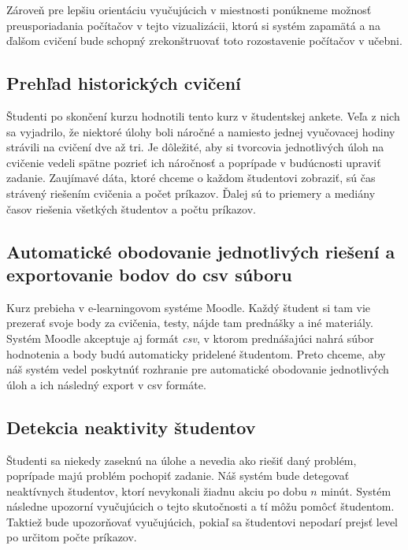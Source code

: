 Zároveň pre lepšiu orientáciu vyučujúcich v miestnosti ponúkneme možnosť
preusporiadania počítačov v tejto vizualizácii, ktorú si systém zapamätá a
na ďalšom cvičení bude schopný zrekonštruovať toto rozostavenie počítačov v učebni.

\subsection{Prehľad historických cvičení}
\label{sec:apprequirements:overview}

Študenti po skončení kurzu hodnotili tento kurz v študentskej ankete. Veľa z nich
sa vyjadrilo, že niektoré úlohy boli náročné a namiesto jednej vyučovacej hodiny
strávili na cvičení dve až tri.
Je dôležité, aby si tvorcovia jednotlivých úloh na cvičenie vedeli spätne pozrieť
ich náročnosť a poprípade v budúcnosti upraviť zadanie.
Zaujímavé dáta, ktoré chceme o každom študentovi zobraziť, sú čas strávený riešením cvičenia a počet príkazov. Ďalej sú to priemery a mediány časov riešenia všetkých študentov a počtu príkazov.


\subsection{Automatické obodovanie jednotlivých riešení a exportovanie bodov do csv súboru}
\label{sec:apprequirements:export}

Kurz prebieha v e-learningovom systéme Moodle. Každý študent si tam vie prezerať
svoje body za cvičenia, testy, nájde tam prednášky a iné materiály. Systém Moodle akceptuje aj formát
\textit{csv}, v ktorom prednášajúci nahrá súbor hodnotenia a body budú automaticky pridelené
študentom. Preto chceme, aby náš systém vedel poskytnúť rozhranie pre automatické
obodovanie jednotlivých úloh a ich následný export v csv formáte.

\subsection{Detekcia neaktivity študentov}
\label{sec:apprequirements:noactivity}

Študenti sa niekedy zaseknú na úlohe a nevedia ako riešiť daný problém, poprípade
majú problém pochopiť zadanie. Náš systém bude detegovať neaktívnych študentov, ktorí
nevykonali žiadnu akciu po dobu $n$ minút. Systém následne upozorní vyučujúcich o tejto
skutočnosti a tí môžu pomôcť študentom.
Taktiež bude upozorňovať vyučujúcich, pokiaľ sa študentovi nepodarí prejsť level
po určitom počte príkazov.

